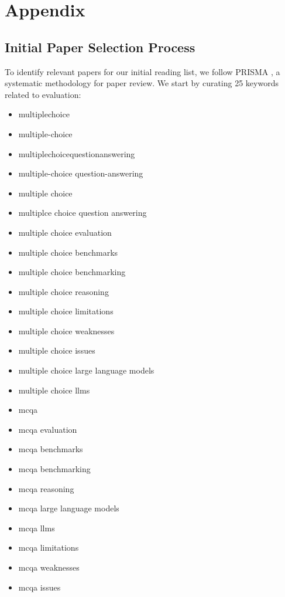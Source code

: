 \section{Appendix}

\subsection{Initial Paper Selection Process} \label{appendix:paper_selection}

To identify relevant papers for our initial reading list, we follow PRISMA \cite{page2021prisma}, a systematic methodology for paper review.
We start by curating 25 keywords related to \mcqa evaluation:

\begin{itemize}[noitemsep, topsep=0pt]
    \item multiplechoice
    \item multiple-choice
    \item multiplechoicequestionanswering
    \item multiple-choice question-answering
    \item multiple choice
    \item multiplce choice question answering
    \item multiple choice evaluation
    \item multiple choice benchmarks
    \item multiple choice benchmarking
    \item multiple choice reasoning
    \item multiple choice limitations
    \item multiple choice weaknesses
    \item multiple choice issues
    \item multiple choice large language models
    \item multiple choice llms
    \item mcqa
    \item mcqa evaluation
    \item mcqa benchmarks
    \item mcqa benchmarking
    \item mcqa reasoning
    \item mcqa large language models
    \item mcqa llms
    \item mcqa limitations
    \item mcqa weaknesses
    \item mcqa issues
\end{itemize}


